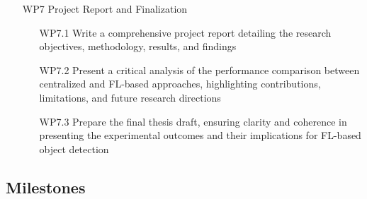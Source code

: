 \documentclass[thesis]{mas_proposal}
\begin{document}
\begin{enumerate}
      \item[WP7] Project Report and Finalization
            \begin{itemize}
                  \item[WP7.1] Write a comprehensive project report detailing the research objectives, methodology, results, and findings
                  \item[WP7.2] Present a critical analysis of the performance comparison between centralized and FL-based approaches, highlighting contributions, limitations, and future research directions
                  \item[WP7.3] Prepare the final thesis draft, ensuring clarity and coherence in presenting the experimental outcomes and their implications for FL-based object detection
            \end{itemize}

\end{enumerate}

\subsection{Milestones}
\end{document}
